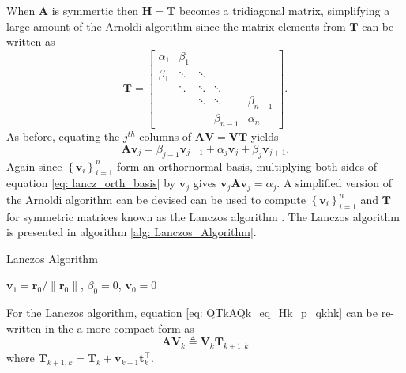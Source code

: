 When $\bm{A}$ is symmertic then $\bm{H} = \bm{T}$ becomes a tridiagonal matrix, simplifying a large amount of the Arnoldi algorithm since the matrix elements from $\bm{T}$ can be written as
\[
    \bm{T} =
    \begin{bmatrix}
        \alpha_1 & \beta_1 &        &             &             \\
        \beta_1  & \ddots  & \ddots &             &             \\
                 & \ddots  & \ddots & \ddots      &             \\
                 &         & \ddots & \ddots      & \beta_{n-1} \\
                 &         &        & \beta_{n-1} & \alpha_{n}
    \end{bmatrix}.
\]
As before, equating the $j^{th}$ columns of $\bm{A} \bm{V} = \bm{V} \bm{T}$ yields
\begin{equation}\label{eq: lancz_orth_basis}
    \bm{A} \bm{v}_{j} = \beta_{j-1} \bm{v}_{j-1} + \alpha_{j} \bm{v}_j + \beta_j \bm{v}_{j+1}.
\end{equation}
Again since $\left\{ \bm{v}_{i} \right\}_{i=1}^{n}$ form an orthornormal basis, multiplying both sides of equation \ref{eq: lancz_orth_basis} by $\bm{v}_j$ gives $\bm{v}_j \bm{A} \bm{v}_j = \alpha_j$. A simplified version of the Arnoldi algorithm can be devised can be used to compute $\left\{ \bm{v}_{i} \right\}_{i=1}^{n}$ and $\bm{T}$ for symmetric matrices known as the Lanczos algorithm \cite{DemmelJamesW1997Anla}. The Lanczos algorithm is presented in algorithm \ref{alg: Lanczos_Algorithm}.

{\centering
\begin{minipage}{.85\linewidth}
    \begin{algorithm}[H]
        \caption{Lanczos Algorithm}
        \label{alg: Lanczos_Algorithm}
        \SetAlgoLined
        \DontPrintSemicolon

        \BlankLine
        $\bm{v}_1 = \bm{r}_0 / \| \bm{r}_0 \|$, $\beta_0 = 0$, $\bm{v}_0 = 0$\;
        \BlankLine
    \end{algorithm}
\end{minipage}
\par
}

For the Lanczos algorithm, equation \ref{eq: QTkAQk_eq_Hk_p_qkhk} can be re-written in the a more compact form as
\begin{equation}\label{eq: AVk_eq_VkTk1k}
    \bm{A} \bm{V}_{k} \triangleq \bm{V}_{k} \bm{T}_{k+1,k}
\end{equation}
where $\bm{T}_{k+1,k} = \bm{T}_{k} + \bm{v}_{k+1} \bm{t}_{k}^{\intercal}$.